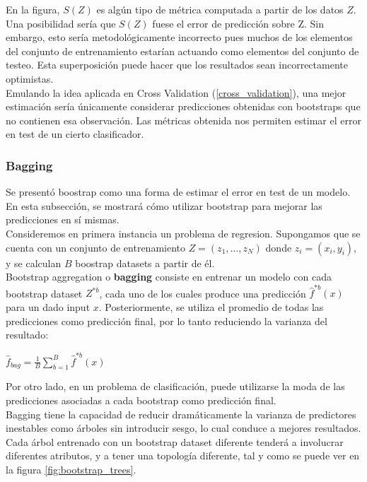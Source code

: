 En la figura, $S(Z)$ es algún tipo de métrica computada a partir de los datos $Z$. Una posibilidad sería que $S(Z)$ fuese el error de predicción sobre Z. Sin embargo, esto sería metodológicamente incorrecto pues muchos de los elementos del conjunto de entrenamiento estarían actuando como elementos del conjunto de testeo. Esta superposición puede hacer que los resultados sean incorrectamente optimistas.  \\

Emulando la idea aplicada en Cross Validation (\ref{cross_validation}), una mejor estimación sería únicamente considerar predicciones obtenidas con bootstraps que no contienen esa observación.  Las métricas obtenida nos permiten estimar el error en test de un cierto clasificador.

\subsubsection{Bagging}

Se presentó boostrap como una forma de estimar el error en test de un modelo. En esta subsección, se mostrará cómo utilizar bootstrap para mejorar las predicciones en sí mismas. \\

Consideremos en primera instancia un problema de regresion. Supongamos que se cuenta con un conjunto de entrenamiento $Z=(z_1, \ldots, z_N)$ donde $z_i=(x_i,y_i)$, y se calculan  $B$ boostrap datasets a partir de él. \\

Bootstrap aggregation o \textbf{bagging} \cite{breiman96} consiste en entrenar un modelo con cada bootstrap dataset $Z^{*b}$, cada uno de los cuales produce una predicción $\hat{f}^{*b}(x)$ para un dado input $x$. Posteriormente, se utiliza el promedio de todas las predicciones como predicción final, por lo tanto reduciendo la varianza del resultado:

\begin{center}
$\hat{f}_{bag} = \frac{1}{B} \sum\limits_{b=1}^B \hat{f}^{*b}(x)$
\end{center}

Por otro lado, en un problema de clasificación, puede utilizarse la moda de las predicciones asociadas a cada bootstrap como predicción final. \\

Bagging tiene la capacidad de reducir dramáticamente la varianza de predictores inestables como árboles sin introducir sesgo, lo cual conduce a mejores resultados. Cada árbol entrenado con un bootstrap dataset diferente tenderá a involucrar diferentes atributos, y a tener una topología diferente, tal y como se puede ver en la figura \ref{fig:bootstrap_trees}. 

